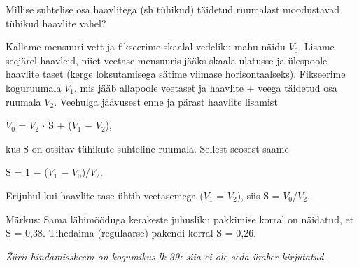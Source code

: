 
Millise suhtelise osa haavlitega (sh tühikud) täidetud ruumalast moodustavad tühikud haavlite vahel?

\hint

\solu
Kallame mensuuri vett ja fikseerime skaalal vedeliku mahu näidu $V_0$. Lisame seejärel haavleid, niiet veetase mensuuris jääks skaala ulatusse ja ülespoole haavlite taset (kerge loksutamisega sätime viimase horisontaalseks). Fikseerime koguruumala $V_1$, mis jääb allapoole veetaset ja haavlite + veega täidetud osa ruumala $V_2$. Veehulga jäävusest enne ja pärast haavlite lisamist

$V_0$ = $V_2$ $\cdot$ S + ($V_1$ $-$ $V_2$),

kus S on otsitav tühikute suhteline ruumala. Sellest seosest saame

S = 1 $-$ ($V_1$ $-$ $V_0$)/$V_2$.

Erijuhul kui haavlite tase ühtib veetasemega ($V_1$ = $V_2$), siis S = $V_0$/$V_2$.

Märkus: Sama läbimõõduga kerakeste juhusliku pakkimise korral on näidatud, et S = 0,38. Tihedaima (regulaarse) pakendi korral S = 0,26.

\textit{Žürii hindamisskeem on kogumikus lk 39; siia ei ole seda ümber kirjutatud.}
\probend

